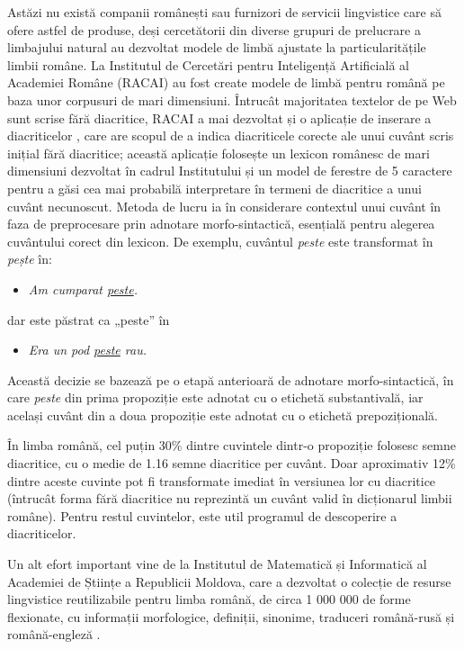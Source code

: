 \begin{multicols}{2}
Astăzi nu există companii românești sau furnizori de servicii lingvistice care să ofere astfel de produse, deși cercetătorii din diverse grupuri de prelucrare a limbajului natural au dezvoltat modele de limbă ajustate la particularitățile limbii române. La Institutul de Cercetări pentru Inteligență Artificială al Academiei Române (RACAI) au fost create modele de limbă pentru română pe baza unor corpusuri de mari dimensiuni. Întrucât majoritatea textelor de pe Web sunt scrise fără diacritice, RACAI a mai dezvoltat și o aplicație de inserare a diacriticelor \cite{DIAC}, care are scopul de a indica diacriticele corecte ale unui cuvânt scris inițial fără diacritice; această aplicație folosește un lexicon românesc de mari dimensiuni dezvoltat în cadrul Institutului și un model de ferestre de 5 caractere pentru a găsi cea mai probabilă interpretare în termeni de diacritice a unui cuvânt necunoscut. Metoda de lucru ia în considerare contextul unui cuvânt în faza de preprocesare prin adnotare morfo-sintactică, esențială pentru alegerea cuvântului corect din lexicon. De exemplu, cuvântul \textit{peste} este transformat în \textit{pește} în:

\begin{itemize}
\item \textit{Am cumparat \underline{peste}.}
\end{itemize}

dar este păstrat ca „peste” în

\begin{itemize}
\item \textit{Era un pod \underline{peste} rau. }
\end{itemize}

Această decizie se bazează pe o etapă anterioară de adnotare morfo-sintactică, în care \textit{peste} din prima propoziție este adnotat cu o etichetă substantivală, iar același cuvânt din a doua propoziție este adnotat cu o etichetă prepozițională.

În limba română, cel puțin 30\% dintre cuvintele dintr-o propoziție folosesc semne diacritice, cu o medie de 1.16 semne diacritice per cuvânt. Doar aproximativ 12\% dintre aceste cuvinte pot fi transformate imediat în versiunea lor cu diacritice (întrucât forma fără diacritice nu reprezintă un cuvânt valid în dicționarul limbii române). Pentru restul cuvintelor, este util programul de descoperire a diacriticelor.

Un alt efort important vine de la Institutul de Matematică și Informatică al Academiei de Științe a Republicii Moldova, care a dezvoltat o colecție de resurse lingvistice reutilizabile pentru limba română, de circa 1 000 000 de forme flexionate, cu informații morfologice, definiții, sinonime, traduceri română-rusă și română-engleză \cite{elrr}.


\end{multicols}
